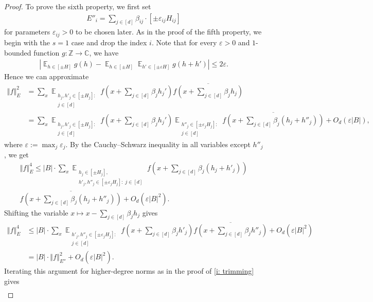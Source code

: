 \documentclass[11pt]{amsart}
\theoremstyle{definition}
\DeclareMathOperator*{\E}{\mathbb{E}}
\newcommand{\C}{{\mathbb C}}
\newcommand{\Z}{{\mathbb Z}}
\newcommand{\norm}[1]{\left\Vert #1\right\Vert}
\newcommand{\veps}{\varepsilon}
\newcommand{\abs}[1]{\mathopen{}\left| #1\mathclose{}\right|}
\newcommand{\brac}[1]{\mathopen{}\left( #1 \mathclose{}\right)}
\begin{document}
\begin{proof}
    To prove the sixth property, we first set 
    \begin{align*}
        E''_i = \sum_{j\in [d]}\beta_{ij}\cdot[\pm\veps_{ij} H_{ij}]
    \end{align*}
    for parameters $\veps_{ij}>0$ to be chosen later.
    As in the proof of the fifth property, we begin with the $s=1$ case and drop the index $i$. Note that for every $\veps>0$ and $1$-bounded function $g:\Z\to\C$, we have
    \begin{align}\label{E: extra averaging}
        \abs{\E_{h\in[\pm H]}g(h)-\E_{h\in[\pm H]}\E_{h'\in[\pm\veps H]}g(h+h')}\leq 2\veps.
    \end{align}
    Hence we can approximate
    \begin{align*}
        \norm{f}_E^2 &= \sum_x \E_{\substack{h_j, h'_j\in [\pm H_j]:\\ {j\in[d]}}} f\brac{x+\sum_{j\in [d]}\beta_j h_j'} \overline{f\brac{x+\sum_{j\in [d]}\beta_j h_j}}\\
        &=\sum_x \E_{\substack{h_j, h'_j\in [\pm H_j]:\\ {j\in[d]}}} f\brac{x+\sum_{j\in [d]}\beta_j h_j'}\E_{\substack{h''_j\in [\pm\veps_j H_j]:\\ {j\in[d]}}} \overline{f\brac{x+\sum_{j\in [d]}\beta_j (h_j+h''_j)}} + O_d(\veps|B|),
    \end{align*}
    where $\veps := \max_j \veps_j$.
    By the Cauchy--Schwarz inequality in all variables except $h''_j$, we get
    \begin{multline*}
        \norm{f}_{E}^4\leq |B|\cdot \sum_x \E_{\substack{h_j\in [\pm H_j],\\ h'_j, h''_j\in [\pm\veps_j H_j]:\; {j\in[d]}}}f\brac{x+\sum_{j\in [d]}\beta_j (h_j+h'_j)}\\ \overline{f\brac{x+\sum_{j\in [d]}\beta_j (h_j+h''_j)}} + O_d(\veps|B|^2).
    \end{multline*}
    Shifting the variable $x\mapsto x - \sum_{j\in [d]}\beta_j h_j$ gives
    \begin{align*}
        \norm{f}_{E}^4 &\leq |B|\cdot \sum_x \E_{\substack{h'_j, h''_j\in [\pm\veps_j H_j]:\\ {j\in[d]}}}f\brac{x+\sum_{j\in [d]}\beta_j h'_j} \overline{f\brac{x+\sum_{j\in [d]}\beta_j h''_j}} + O_d(\veps|B|^2)\\
        &= |B| \cdot\norm{f}_{E''}^2+ O_d(\veps|B|^2).
    \end{align*}
    Iterating this argument for higher-degree norms as in the proof of \eqref{i: trimming} gives
    \begin{align*}

\end{align*}
\end{proof}
\end{document}
